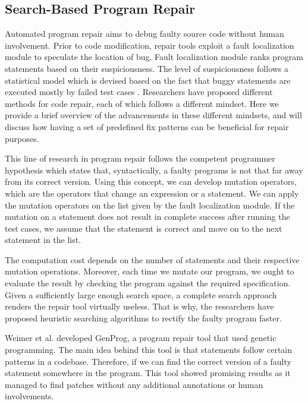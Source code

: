 \subsection{Search-Based Program Repair}

Automated program repair aims to debug faulty source code without human involvement. Prior to code modification, repair tools exploit a fault localization module to speculate the location of bug. Fault localization \cite{jones2005empirical} module ranks program statements based on their suspiciousness. The level of suspiciousness follows a statistical model which is devised based on the fact that buggy statements are executed mostly by failed test cases \cite{naish2009spectral} \cite{xie2013theoretical}. Researchers have proposed different methods for code repair, each of which follows a different mindset. Here we provide a brief overview of the advancements in these different mindsets, and will discuss how having a set of predefined fix patterns can be beneficial for repair purposes.

This line of research in program repair follows the competent programmer hypothesis \cite{gopinath2014mutant} which states that, syntactically, a faulty programs is not that far away from its correct version. Using this concept, we can develop mutation operators, which are the operators that change an expression or a statement. We can apply the mutation operators on the list given by the fault localization module. If the mutation on a statement does not result in complete success after running the test cases, we assume that the statement is correct and move on to the next statement in the list. 

The computation cost depends on the number of statements and their respective mutation operations. Moreover, each time we mutate our program, we ought to evaluate the result by checking the program against the required specification. Given a sufficiently large enough search space, a complete search approach renders the repair tool virtually useless. That is why, the researchers have proposed heuristic searching algorithms to rectify the faulty program faster.

Weimer et al. \cite{forrest2009genetic} \cite{nguyen2009using} developed GenProg, a program repair tool that used genetic programming. The main idea behind this tool is that statements follow certain patterns in a codebase. Therefore, if we can find the correct version of a faulty statement somewhere in the program. This tool showed promising results as it managed to find patches without any additional annotations or human involvements.

